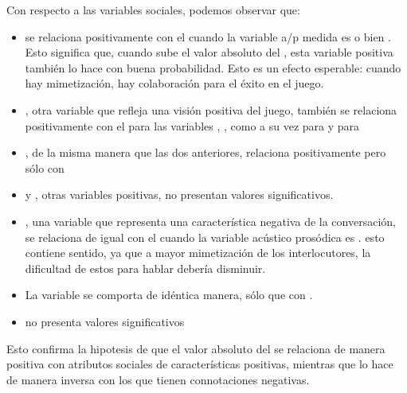 Con respecto a las variables sociales, podemos observar que:

\begin{itemize}
  \item \svcontributes se relaciona positivamente con el \absentrainment cuando la variable a/p medida es \FOMEAN o bien \NOISETOHARMONICS. Esto significa que, cuando sube el valor absoluto del \entrainment, esta variable positiva también lo hace con buena probabilidad. Esto es un efecto esperable: cuando hay mimetización, hay colaboración para el éxito en el juego.
  \item \svclear, otra variable que refleja una visión positiva del juego, también se relaciona positivamente con el \absentrainment para las variables \FOMEAN, \NOISETOHARMONICS, \ENGMAX como a su vez para \PHONAVG y para \SYLCOUNT
  \item \svengaged, de la misma manera que las dos anteriores, relaciona positivamente pero sólo con \FOMEAN
  \item \svplanning y \svencourages, otras variables positivas, no presentan valores significativos.
  \item \svdifficult, una variable que representa una característica negativa de la conversación, se relaciona de igual con el \absentrainment cuando la variable acústico prosódica es \ENGMAX. esto contiene sentido, ya que a mayor mimetización de los interlocutores, la dificultad de estos para hablar debería disminuir.
  \item La variable \svbored se comporta de idéntica manera, sólo que con \FOMEAN.
  \item \svdislikes no presenta valores significativos
\end{itemize}

Esto confirma la hipotesis de que el valor absoluto del \entrainment se relaciona de manera positiva con atributos sociales de características positivas, mientras que lo hace de manera inversa con los que tienen connotaciones negativas.



